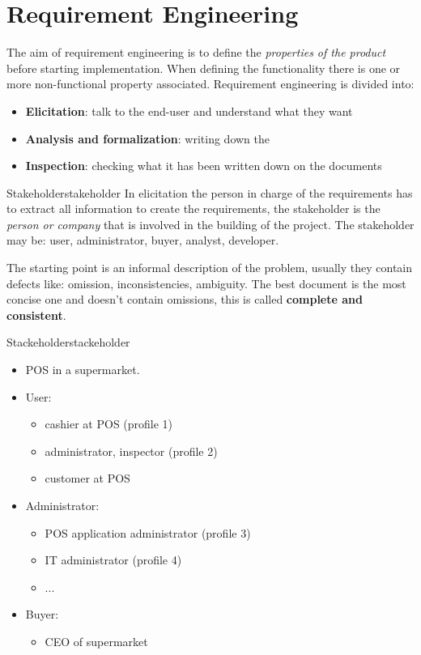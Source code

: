 \documentclass[12pt]{article}
\begin{document}
\section{Requirement Engineering}
The aim of requirement engineering is to define the \emph{properties of the product} before starting implementation. When defining the functionality there is one or more non-functional property associated. Requirement engineering is divided into:
\begin{itemize}
  \item \textbf{Elicitation}: talk to the end-user and understand what they want
  \item \textbf{Analysis and formalization}: writing down the 
  \item \textbf{Inspection}: checking what it has been written down on the documents
\end{itemize}
\begin{definition}{Stakeholder}{stakeholder}
  In elicitation the person in charge of the requirements has to extract all information to create the requirements, the stakeholder is the \emph{person or company} that is involved in the building of the project. The stakeholder may be: user, administrator, buyer, analyst, developer.
\end{definition}
The starting point is an informal description of the problem, usually they contain defects like: omission, inconsistencies, ambiguity. The best document is the most concise one and doesn't contain omissions, this is called \textbf{complete and consistent}.
\begin{example}{Stackeholder}{stackeholder}
  \begin{itemize}
    \item POS in a supermarket.
    \item User:
      \begin{itemize}
        \item cashier at POS (profile 1)
        \item administrator, inspector (profile 2)
        \item customer at POS
      \end{itemize}
    \item Administrator:
      \begin{itemize}
        \item POS application administrator (profile 3)
        \item IT administrator (profile 4)
        \item ...
      \end{itemize}
    \item Buyer:
      \begin{itemize}
        \item CEO of supermarket
      \end{itemize}
  \end{itemize}
\end{example}
\end{document}
